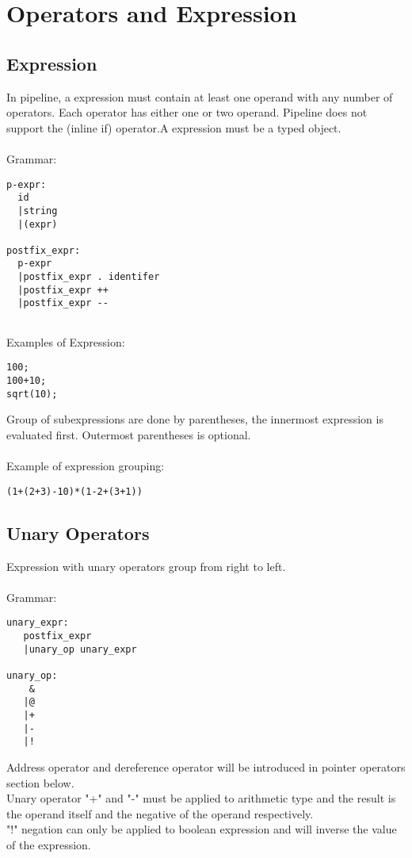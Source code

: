 \documentclass[./LRM_main.tex]{subfiles}
\begin{document}
\section{Operators and Expression}
\subsection{Expression}
In pipeline, a expression must contain at least one operand with any number of operators. Each operator has either one or two operand. Pipeline does not support the (inline if) operator.A expression must be a typed object.\\ 
\vspace{1mm}\\
Grammar:
\begin{lstlisting}
p-expr:
  id
  |string
  |(expr)

postfix_expr:
  p-expr
  |postfix_expr . identifer
  |postfix_expr ++
  |postfix_expr --
    
\end{lstlisting}
Examples of Expression:
\begin{lstlisting}
100;
100+10;
sqrt(10);
\end{lstlisting}
\vspace{1 mm}
Group of subexpressions are done by parentheses, the innermost expression is evaluated first. Outermost parentheses is optional.\\
\vspace{1 mm}\\
Example of expression grouping:
\begin{lstlisting}
(1+(2+3)-10)*(1-2+(3+1))
\end{lstlisting}
\subsection{Unary Operators}
Expression with unary operators group from right to left.\\
\vspace{1 mm}\\
Grammar:
\begin{lstlisting}
unary_expr:
   postfix_expr
   |unary_op unary_expr

unary_op:
    &
   |@
   |+
   |-
   |!
\end{lstlisting}
Address operator and dereference operator will be introduced in pointer operators section below.\\
Unary operator "+" and "-" must be applied to arithmetic type and the result is the operand itself and the negative of the operand respectively.\\
"!" negation can only be applied to boolean expression and will inverse the value of the expression.\\ 
\end{document}
